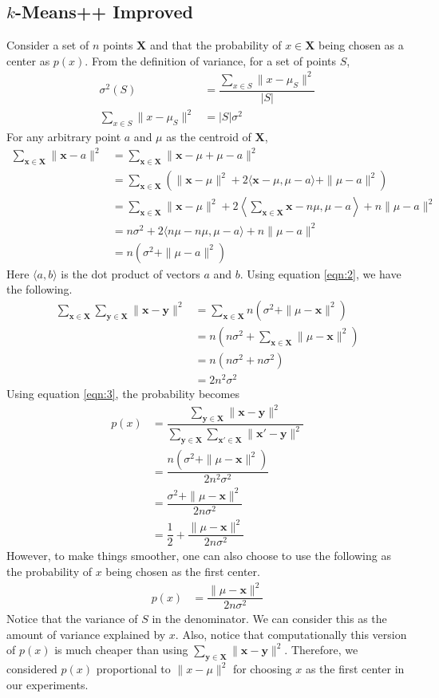 \documentclass[twoside, 11pt]{article}
\newcommand{\x}{\mathbf{x}}
\newcommand{\X}{\mathbf{X}}
\newcommand{\y}{\mathbf{y}}
\begin{document}
	\subsection{$k$-Means++ Improved}
	Consider a set of $n$ points $\X$ and that the probability of $x\in\X$ being chosen as a center as $p(x)$. From the definition of variance, for a set of points $S$,
		\begin{align}
			\sigma^2(S) & = \dfrac{\sum_{x\in S} \|x-\mu_{S}\|^2}{|S|}\nonumber\\
			\sum_{x\in S}\|x-\mu_{S}\|^2 & = |S|\sigma^2\label{eqn:1}
		\end{align}
	For any arbitrary point $a$ and $\mu$ as the centroid of $\X$,
		\begin{align}
			\sum_{\x\in\X}\|\x-a\|^2
				  & = \sum_{\x\in\X}\|\x-\mu+\mu-a\|^2\nonumber\\
				  & = \sum_{\x\in\X}\left(\|\x-\mu\|^2+2\langle\x-\mu,\mu-a\rangle+\|\mu-a\|^2\right)\nonumber\\
				  & = \sum_{\x\in\X}\|\x-\mu\|^2+2\left\langle\sum_{\x\in\X}\x-n\mu,\mu-a\right\rangle+n\|\mu-a\|^2\nonumber\\
				  & = n\sigma^2+2\langle n\mu-n\mu,\mu-a\rangle+n\|\mu-a\|^2\nonumber\\
				  & = n(\sigma^2+\|\mu-a\|^2)\label{eqn:2}
		\end{align}
	Here $\langle a,b\rangle$ is the dot product of vectors $a$ and $b$. Using equation \eqref{eqn:2}, we have the following.
		\begin{align}
			\sum_{\x\in\X}\sum_{\y\in\X}\|\x-\y\|^2 
				& = \sum_{\x\in\X}n(\sigma^2+\|\mu-\x\|^2)\nonumber\\
				& = n(n\sigma^2+\sum_{\x\in\X}\|\mu-\x\|^2)\nonumber\\
				& = n(n\sigma^2+n\sigma^2)\nonumber\\
				& = 2n^2\sigma^2\label{eqn:3}
		\end{align}
	Using equation \eqref{eqn:3}, the probability becomes
		\begin{align*}
			p(x) & = \dfrac{\sum_{\y\in\X}\|\x-\y\|^2}{\sum_{\y\in\X}\sum_{\x'\in\X}\|\x'-\y\|^2}\\
				 & = \dfrac{n(\sigma^2+\|\mu-\x\|^2)}{2n^2\sigma^2}\\
				 & = \dfrac{\sigma^2+\|\mu-\x\|^2}{2n\sigma^2}\\
				 & = \dfrac{1}{2}+\dfrac{\|\mu-\x\|^2}{2n\sigma^2}
		\end{align*}
	However, to make things smoother, one can also choose to use the following as the probability of $x$ being chosen as the first center.
		\begin{align*}
			p(x) & = \dfrac{\|\mu-\x\|^2}{2n\sigma^2}
		\end{align*}
	Notice that the variance of $S$ in the denominator. We can consider this as the amount of variance explained by $x$. Also, notice that computationally this version of $p(x)$ is much cheaper than using $\sum_{\y\in\X}\|\x-\y\|^2$. Therefore, we considered $p(x)$ proportional to $\|x-\mu\|^2$ for choosing $x$ as the first center in our experiments.
\end{document}
